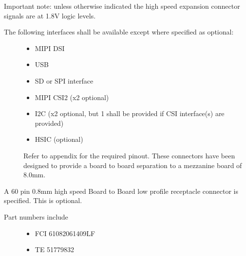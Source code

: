 \documentclass[a4paper,10pt,oneside,english]{sphinxmanual}
\begin{document}
\sphinxAtStartPar
Important note: unless otherwise indicated the high speed expansion connector signals are at 1.8V logic levels.
\begin{description}
\item[{The following interfaces shall be available except where specified as optional:}] \leavevmode\begin{itemize}
\item {} 
\sphinxAtStartPar
MIPI DSI

\item {} 
\sphinxAtStartPar
USB

\item {} 
\sphinxAtStartPar
SD or SPI interface

\item {} 
\sphinxAtStartPar
MIPI CSI\sphinxhyphen{}2 (x2 optional)

\item {} 
\sphinxAtStartPar
I2C (x2 optional, but 1 shall be provided if CSI interface(s) are provided)

\item {} 
\sphinxAtStartPar
HSIC (optional)

\end{itemize}

\sphinxAtStartPar
Refer to appendix for the required pinout. These connectors have been designed to provide a board to board separation to a mezzanine board of 8.0mm.

\end{description}

\sphinxAtStartPar
{}

\sphinxAtStartPar
A 60 pin 0.8mm high speed Board to Board low profile receptacle connector is specified. This is optional.
\begin{description}
\item[{Part numbers include}] \leavevmode\begin{itemize}
\item {} 
\sphinxAtStartPar
FCI 61082\sphinxhyphen{}061409LF

\item {} 
\sphinxAtStartPar
TE 5177983\sphinxhyphen{}2

\end{itemize}

\end{description}
\end{document}
